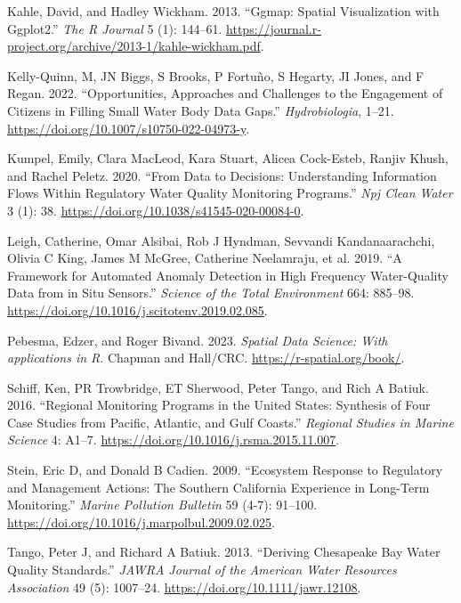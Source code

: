 \begin{CSLReferences}{1}{0}
\leavevmode{}%
Kahle, David, and Hadley Wickham. 2013. {``Ggmap: Spatial Visualization with Ggplot2.''} \emph{The R Journal} 5 (1): 144--61. \url{https://journal.r-project.org/archive/2013-1/kahle-wickham.pdf}.

\leavevmode{}%
Kelly-Quinn, M, JN Biggs, S Brooks, P Fortuño, S Hegarty, JI Jones, and F Regan. 2022. {``Opportunities, Approaches and Challenges to the Engagement of Citizens in Filling Small Water Body Data Gaps.''} \emph{Hydrobiologia}, 1--21. \url{https://doi.org/10.1007/s10750-022-04973-y}.

\leavevmode{}%
Kumpel, Emily, Clara MacLeod, Kara Stuart, Alicea Cock-Esteb, Ranjiv Khush, and Rachel Peletz. 2020. {``From Data to Decisions: Understanding Information Flows Within Regulatory Water Quality Monitoring Programs.''} \emph{Npj Clean Water} 3 (1): 38. \url{https://doi.org/10.1038/s41545-020-00084-0}.

\leavevmode{}%
Leigh, Catherine, Omar Alsibai, Rob J Hyndman, Sevvandi Kandanaarachchi, Olivia C King, James M McGree, Catherine Neelamraju, et al. 2019. {``A Framework for Automated Anomaly Detection in High Frequency Water-Quality Data from in Situ Sensors.''} \emph{Science of the Total Environment} 664: 885--98. \url{https://doi.org/10.1016/j.scitotenv.2019.02.085}.

\leavevmode{}%
Pebesma, Edzer, and Roger Bivand. 2023. \emph{{Spatial Data Science: With applications in R}}. {Chapman and Hall/CRC}. \url{https://r-spatial.org/book/}.

\leavevmode{}%
Schiff, Ken, PR Trowbridge, ET Sherwood, Peter Tango, and Rich A Batiuk. 2016. {``Regional Monitoring Programs in the United States: Synthesis of Four Case Studies from Pacific, Atlantic, and Gulf Coasts.''} \emph{Regional Studies in Marine Science} 4: A1--7. \url{https://doi.org/10.1016/j.rsma.2015.11.007}.

\leavevmode{}%
Stein, Eric D, and Donald B Cadien. 2009. {``Ecosystem Response to Regulatory and Management Actions: The Southern California Experience in Long-Term Monitoring.''} \emph{Marine Pollution Bulletin} 59 (4-7): 91--100. \url{https://doi.org/10.1016/j.marpolbul.2009.02.025}.

\leavevmode{}%
Tango, Peter J, and Richard A Batiuk. 2013. {``Deriving {C}hesapeake {B}ay Water Quality Standards.''} \emph{JAWRA Journal of the American Water Resources Association} 49 (5): 1007--24. \url{https://doi.org/10.1111/jawr.12108}.


\end{CSLReferences}
